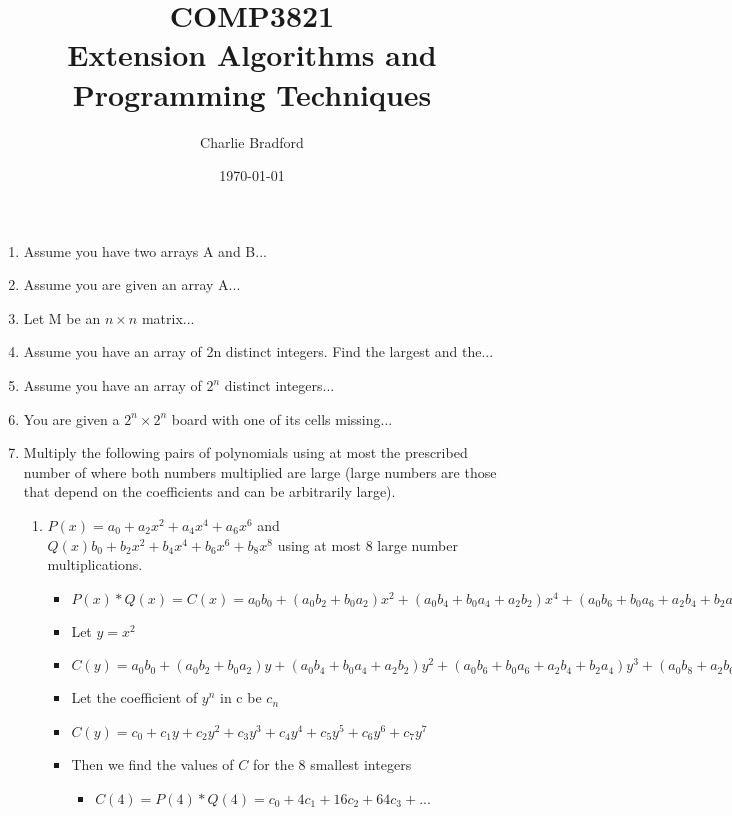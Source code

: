 \documentclass[a4paper]{article}
\title{%
		COMP3821 \\
\large Extension Algorithms and Programming Techniques}
\author{Charlie Bradford}
\date{\today}
\begin{document}
\maketitle

\begin{enumerate}
		\item Assume you have two arrays A and B...
		\item Assume you are given an array A...
		\item Let M be an $n \times n$ matrix...
		\item Assume you have an array of 2n distinct integers. Find the largest and the...
		\item Assume you have an array of $2^n$ distinct integers...
		\item You are given a $2^n \times 2^n$ board with one of its cells missing...
		\item Multiply the following pairs of polynomials using at most the prescribed number of where both numbers multiplied are large (large numbers are those that depend on the coefficients and can be arbitrarily large).
				\begin{enumerate}
						\item $P(x) = a_0 + a_2 x^2 + a_4 x^4 + a_6 x^6$ and $Q(x) b_0 + b_2 x^2 + b_4 x^4 + b_6 x^6 + b_8 x^8$ using at most 8 large number multiplications.
								\begin{itemize}
										\item $P(x) * Q(x) = C(x) = a_0 b_0 + (a_0 b_2 + b_0 a_2 )x^2 + (a_0 b_4 + b_0 a_4 + a_2 b_2) x^4 + (a_0 b_6 + b_0 a_6 + a_2 b_4 + b_2 a_4) x^6 + (a_0 b_8 + a_2 b_6 + b_2 a_6 + a_4 b_4) x^8 + (a_2 b_8 + a_4 b_6 + b_4 a_6) x^{10} + (a_6 b_6 + a_4 b_8) x^{12} + a_6 b_8 x^{14}$
										\item Let $ y = x^2$
										\item $C(y) = a_0 b_0 + (a_0 b_2 + b_0 a_2 )y + (a_0 b_4 + b_0 a_4 + a_2 b_2) y^2 + (a_0 b_6 + b_0 a_6 + a_2 b_4 + b_2 a_4) y^3 + (a_0 b_8 + a_2 b_6 + b_2 a_6 + a_4 b_4) y^4 + (a_2 b_8 + a_4 b_6 + b_4 a_6) y^{5} + (a_6 b_6 + a_4 b_8) y^{6} + a_6 b_8 y^{7}$
										\item Let the coefficient of $y^n$ in c be $c_n$
										\item $C(y) = c_0 + c_1 y + c_2 y^2 + c_3 y^3 + c_4 y^4 + c_5 y^5 + c_6 y^6 + c_7 y^7$
										\item Then we find the values of $C$ for the 8 smallest integers
												\begin{itemize}
														\item $C(4) = P(4) * Q(4) = c_0 + 4c_1 + 16c_2 + 64c_3 + ...$

\end{itemize}
\end{itemize}
\end{enumerate}
\end{enumerate}
\end{document}
